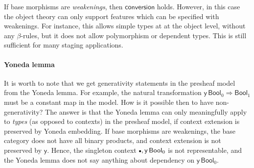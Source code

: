 \documentclass{easychair}
\newcommand{\emptycon}{\scaleobj{.75}\bullet}
\newcommand{\ms}[1]{\mathsf{#1}}
\newcommand{\Bool}{\ms{Bool}}
\begin{document}
If base morphisms are \emph{weakenings}, then $\ms{conversion}$
holds. However, in this case the object theory can only support features which
can be specified with weakenings. For instance, this allows simple types at at
the object level, without any $\beta$-rules, but it does not allow polymorphism
or dependent types. This is still sufficient for many staging applications.

\paragraph{Yoneda lemma} It is worth to note that we get generativity statements
in the presheaf model from the Yoneda lemma. For example, the natural
transformation $\ms{y}\,\Bool_0 \Rightarrow \Bool_1$ must be a constant map in the
model. How is it possible then to have non-generativity? The answer is that
the Yoneda lemma can only meaningfully apply to \emph{types} (as opposed to
contexts) in the presheaf model, if context extension is preserved by Yoneda
embedding. If base morphisms are weakenings, the base category does not have all
binary products, and context extension is not preserved by $\ms{y}$. Hence, the
singleton context $\emptycon,\ms{y}\,\Bool_0$ is not representable, and the
Yoneda lemma does not say anything about dependency on $\ms{y}\,\Bool_0$.




\end{document}
